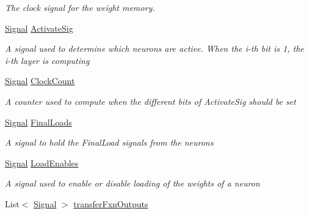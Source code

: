 \begin{DoxyCompactItemize}
\begin{DoxyCompactList}\small\item\em The clock signal for the weight memory. \end{DoxyCompactList}\item 
\hyperlink{class_n_n_gen_1_1_signal}{Signal} \hyperlink{class_n_n_gen_1_1_sync_neural_network_a3d9360657f0a709cc8682eac7465e96f}{Activate\+Sig}
\begin{DoxyCompactList}\small\item\em A signal used to determine which neurons are active. When the i-\/th bit is \textquotesingle{}1\textquotesingle{}, the i-\/th layer is computing \end{DoxyCompactList}\item 
\hyperlink{class_n_n_gen_1_1_signal}{Signal} \hyperlink{class_n_n_gen_1_1_sync_neural_network_a6671f2beb14d4e2f2cec90c79046f656}{Clock\+Count}
\begin{DoxyCompactList}\small\item\em A counter used to compute when the different bits of Activate\+Sig should be set \end{DoxyCompactList}\item 
\hyperlink{class_n_n_gen_1_1_signal}{Signal} \hyperlink{class_n_n_gen_1_1_sync_neural_network_a0da1ffac1794b37b1b27b81fd03253a3}{Final\+Loads}
\begin{DoxyCompactList}\small\item\em A signal to hold the Final\+Load signals from the neurons \end{DoxyCompactList}\item 
\hyperlink{class_n_n_gen_1_1_signal}{Signal} \hyperlink{class_n_n_gen_1_1_sync_neural_network_a5005f0c6c9b6377dfc66c2894251f4dd}{Load\+Enables}
\begin{DoxyCompactList}\small\item\em A signal used to enable or disable loading of the weights of a neuron \end{DoxyCompactList}\item 
List$<$ \hyperlink{class_n_n_gen_1_1_signal}{Signal} $>$ \hyperlink{class_n_n_gen_1_1_sync_neural_network_a5d11d979c5498deaa585533ef25883ce}{transfer\+Fxn\+Outputs}

\end{DoxyCompactItemize}
